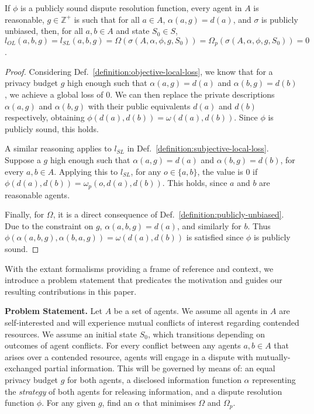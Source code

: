 \documentclass[acmsmall]{custom-arxiv}  %
\begin{document}
\begin{theorem}
\label{theorem:zero-loss}
If $\phi$ is a publicly sound dispute resolution function, every agent in $A$ is reasonable, $g \in \mathbb{Z}^{+}$ is such that for all $a \in A$, $\alpha(a,g) = d(a)$, and $\sigma$ is publicly unbiased, then, for all $a, b \in A$ and state $S_0 \in S$, $l_{OL}(a, b, g) = l_{SL}(a, b, g) = \Omega(\sigma(A, \alpha, \phi, g, S_0)) = \Omega_p(\sigma(A, \alpha, \phi, g, S_0)) = 0$. 
\end{theorem}
\begin{proof}
Considering Def.~\ref{definition:objective-local-loss}, we know that for a privacy budget $g$ high enough such that $\alpha(a,g) = d(a)$ and $\alpha(b,g) = d(b)$, we achieve a global loss of $0$. We can then replace the private descriptions $\alpha(a,g)$ and $\alpha(b,g)$ with their public equivalents $d(a)$ and $d(b)$ respectively, obtaining $\phi(d(a), d(b)) = \omega(d(a), d(b))$. Since $\phi$ is publicly sound, this holds.

A similar reasoning applies to $l_{SL}$ in Def.~\ref{definition:subjective-local-loss}. Suppose a $g$ high enough such that $\alpha(a,g) = d(a)$ and $\alpha(b,g) = d(b)$, for every $a, b \in A$. Applying this to $l_{SL}$, for any $o \in \{a, b\}$, the value is 0 if $\phi(d(a), d(b)) = \omega_p(o, d(a), d(b))$. This holds, since $a$ and $b$ are reasonable agents.

Finally, for $\Omega$, it is a direct consequence of Def.~\ref{definition:publicly-unbiased}. Due to the constraint on $g$, $\alpha(a, b, g) = d(a)$, and similarly for $b$. Thus $\phi(\alpha(a, b, g), \alpha(b, a, g)) = \omega(d(a), d(b))$ is satisfied since $\phi$ is publicly sound.
\end{proof}

With the extant formalisms providing a frame of reference and context, we introduce a problem statement that predicates the motivation and guides our resulting contributions in this paper.

\textbf{Problem Statement.} Let $A$ be a set of agents. We assume all agents in $A$ are self-interested and will experience mutual conflicts of interest regarding contended resources. We assume an initial state $S_0$, which transitions depending on outcomes of agent conflicts. For every conflict between any agents $a, b \in A$ that arises over a contended resource, agents will engage in a dispute with mutually-exchanged partial information. This will be governed by means of: an equal privacy budget $g$ for both agents, a disclosed information function $\alpha$ representing the \textit{strategy} of both agents for releasing information, and a dispute resolution function $\phi$. For any given $g$, find an $\alpha$ that minimises $\Omega$ and $\Omega_p$.%
\end{document}
